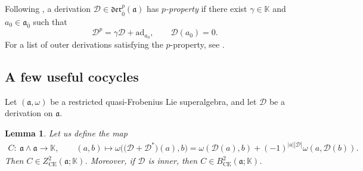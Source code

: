 \documentclass[pdftex]{sigma}
\numberwithin{equation}{section}
\newtheorem{Lemma}[Theorem]{Lemma}
\begin{document}
Following \cite{BBH}, a derivation $\mathscr{D}\in \mathfrak{der}^p_{\bar 0}(\mathfrak{a})$ has \textit{$p$-property} if there exist $\gamma \in \mathbb{K}$ and $a_0\in \mathfrak{a}_{\bar 0}$ such that
\begin{equation}
\label{SConp}
\mathscr{D}^p=\gamma \mathscr{D}+\mathrm{ad}_{a_0},\qquad
\mathscr{D}(a_0)=0.
\end{equation}
For a list of outer derivations satisfying the $p$-property, see \cite{BBH}.
\subsection{A few useful cocycles} Let $(\mathfrak{a}, \omega)$ be a restricted quasi-Frobenius Lie superalgebra, and let ${\mathscr D}$ be a derivation on $\mathfrak{a}$.
\begin{Lemma}\label{Ccocycle}
Let us define the map
\begin{gather} \label{CEcocycle}
C\colon\ \mathfrak{a}\wedge \mathfrak{a} \rightarrow \mathbb K,\qquad (a,b)\mapsto \omega\bigl(\bigl({\mathscr D}+{\mathscr D}^*\bigr)(a),b\bigr)=\omega({\mathscr D}(a), b) +(-1)^{|a||\mathscr{D}|}\omega(a,{\mathscr D}(b)).
\end{gather}
Then $C\in Z^2_{\mathrm{CE}}(\mathfrak{a}; \mathbb{K})$. Moreover, if $\mathscr D$ is inner, then $C\in B^2_{\mathrm{CE}}(\mathfrak{a}; \mathbb{K})$.
\end{Lemma}
\end{document}
